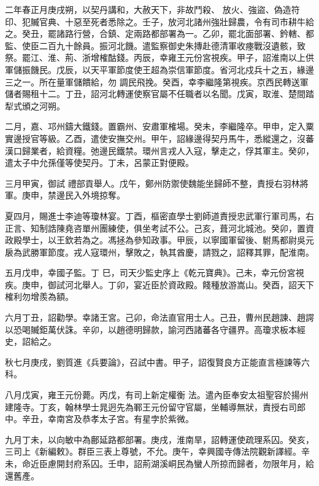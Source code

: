 \begin{pinyinscope}
 二年春正月庚戌朔，以契丹講和，大赦天下，非故鬥殺、
 放火、強盜、偽造符印、犯贓官典、十惡至死者悉除之。壬子，放河北諸州強壯歸農，令有司市耕牛給之。癸丑，罷諸路行營，合鎮、定兩路都部署為一。乙卯，罷北面部署、鈐轄、都監、使臣二百九十餘員。振河北饑。遣監察御史朱摶赴德清軍收瘞戰沒遺骸，致祭。罷江、淮、荊、浙增榷酤錢。丙辰，幸雍王元份宮視疾。甲子，詔淮南以上供軍儲振饑民。戊辰，以天平軍節度使王超為崇信軍節度。省河北戍兵十之五，緣邊三之一。所在量軍儲饋給，勿
 調民飛挽。癸酉，幸李繼隆第視疾。京西民轉送軍儲者賜租十二。丁丑，詔河北轉運使察官屬不任職者以名聞。戊寅，取淮、楚間踏犁式頒之河朔。



 二月，嘉、邛州鑄大鐵錢。置霸州、安肅軍榷場。癸未，李繼隆卒。甲申，定入粟實邊授官等級。乙酉，遣使安撫交州。甲午，詔緣邊得契丹馬牛，悉縱還之，沒蕃漢口歸業者，給資糧。弛邊民鐵禁。環州言戎人入寇，擊走之，俘其軍主。癸卯，遣太子中允孫僅等使契丹。丁未，呂蒙正對便殿。



 三月甲寅，御試
 禮部貢舉人。戊午，鄭州防禦使魏能坐歸師不整，責授右羽林將軍。庚申，禁邊民入外境掠奪。



 夏四月，賜進士李迪等瓊林宴。丁酉，樞密直學士劉師道責授忠武軍行軍司馬，右正言、知制誥陳堯咨單州團練使，俱坐考試不公。己亥，葺河北城池。癸卯，置資政殿學士，以王欽若為之。馮拯為參知政事。甲辰，以寧國軍留後、駙馬都尉吳元扆為武勝軍節度。戎人寇環州，擊敗之，執其酋慶，請戮之，詔釋其罪，配淮南。



 五月戊申，幸國子監。丁
 巳，司天少監史序上《乾元寶典》。己未，幸元份宮視疾。庚申，御試河北舉人。丁卯，宴近臣於資政殿。餞種放游嵩山。癸酉，詔天下榷利勿增羨為額。



 六月丁丑，詔勸學。幸諸王宮。己卯，命法直官用士人。己丑，曹州民趙諫、趙諤以恐喝贓鉅萬伏誅。辛卯，以趙德明歸款，諭河西諸蕃各守疆界。高瓊求板本經史，詔給之。



 秋七月庚戌，劉質進《兵要論》，召試中書。甲子，詔復賢良方正能直言極諫等六科。



 八月戊寅，雍王元份薨。丙戊，有司上新定權衡
 法。遣內臣奉安太祖聖容於揚州建隆寺。丁亥，翰林學士晁迥先為鄆王元份留守官屬，坐輔導無狀，責授右司郎中。辛丑，幸南宮及恭孝太子宮。有星孛於紫微。



 九月丁未，以向敏中為鄜延路都部署。庚戌，淮南旱，詔轉運使疏理系囚。癸亥，三司上《新編敕》。群臣三表上尊號，不允。庚午，幸興國寺傳法院觀新譯經。辛未，命近臣慮開封府系囚。壬申，詔荊湖溪峒民為蠻人所掠而歸者，勿限年月，給還舊產。




\end{pinyinscope}
